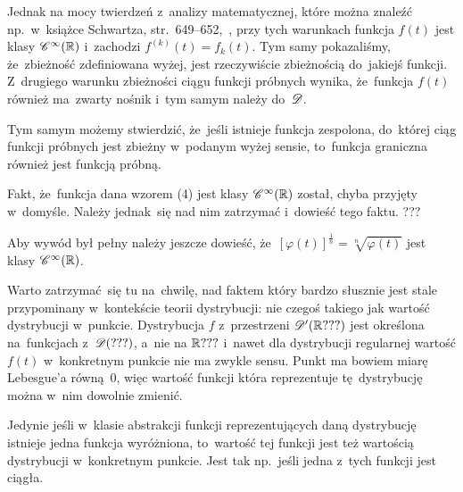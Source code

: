 \documentclass[a4paper,11pt]{article}
\begin{document}
Jednak na mocy twierdzeń z~analizy matematycznej, które można znaleźć
np.~w~książce Schwartza, str.~649--652,~\cite{SchwartzKursAnalizyMatematycznejVolI1979}, przy tych
warunkach funkcja $f( t )$ jest klasy $\mathcal{C}^{ \infty }( \mathbb{R} )$ i~zachodzi
$f^{ ( k ) }( t ) = f_{ k }( t )$. Tym samy pokazaliśmy, że~zbieżność
zdefiniowana wyżej, jest rzeczywiście zbieżnością do~jakiejś funkcji.
Z~drugiego warunku zbieżności ciągu funkcji próbnych wynika,
że~funkcja $f( t )$ również ma~zwarty nośnik i~tym samym należy
do~$\mathcal{D}$.

Tym samym możemy stwierdzić, że~jeśli istnieje funkcja zespolona,
do~której ciąg funkcji próbnych jest zbieżny w~podanym wyżej sensie,
to~funkcja graniczna również jest funkcją próbną.

\VerSpaceFour





\noindent
{} Fakt, że~funkcja dana wzorem (4) jest klasy
$\mathcal{C}^{ \infty }( \mathbb{R} )$ został, chyba przyjęty w~domyśle. Należy jednak~się
nad nim zatrzymać i~dowieść tego faktu. ???

\VerSpaceFour





\noindent
{} Aby wywód był pełny należy jeszcze dowieść,
że~$[ \varphi( t ) ]^{ \frac{ 1 }{ n } } = \sqrt[ n ]{ \varphi( t ) }$ jest
klasy $\mathcal{C}^{ \infty }( \mathbb{R} )$.

\VerSpaceFour





\noindent
{} Warto zatrzymać~się tu na~chwilę, nad faktem który
bardzo słusznie jest stale przypominany w~kontekście teorii
dystrybucji: nie czegoś takiego jak wartość dystrybucji w~punkcie.
Dystrybucja $f$ z~przestrzeni $\mathcal{D}'( \mathbb{R} ??? )$ jest określona
na~funkcjach z~$\mathcal{D}( ??? )$, a~nie na $\mathbb{R} ???$ i~nawet dla dystrybucji
regularnej wartość $f( t )$ w~konkretnym punkcie nie ma zwykle sensu.
Punkt ma bowiem miarę Lebesgue’a równą~0, więc wartość funkcji która
reprezentuje tę~dystrybucję można w~nim dowolnie zmienić.

Jedynie jeśli w~klasie abstrakcji funkcji reprezentujących daną
dystrybucję istnieje jedna funkcja wyróżniona, to~wartość tej funkcji
jest też wartością dystrybucji w~konkretnym punkcie. Jest tak
np.~jeśli jedna z~tych funkcji jest ciągła.

\VerSpaceFour
\end{document}
